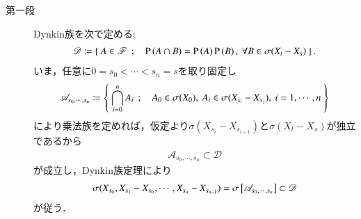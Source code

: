 \begin{prf}[Problem 1.4]\mbox{}
	\begin{description}
		\item[第一段]
			Dynkin族を次で定める:
			\begin{align}
				\mathscr{D} \coloneqq
				\left\{\ A \in \mathscr{F}\ \, ; \quad \operatorname{P} \left(A \cap B\right) = \operatorname{P} \left(A\right)\operatorname{P} \left(B\right),\ \forall B \in \sigma(X_t - X_s)\ \right\}.
			\end{align}
			いま，任意に$0 = s_0 < \cdots < s_n = s$を取り固定し
			\begin{align}
				\mathscr{A}_{s_0, \cdots, s_n} \coloneqq
				\left\{\ \bigcap_{i=0}^n A_i\ \, ; \quad A_0 \in \sigma(X_0),\ A_i \in \sigma(X_{s_i} - X_{s_j}),\ i=1,\cdots,n\ \right\}
			\end{align}
			により乗法族を定めれば，仮定より$\sigma(X_{s_i} - X_{s_{i-1}})$と$\sigma(X_t - X_s)$が独立であるから
			\begin{align}
				\mathscr{A}_{s_0, \cdots, s_n}
				\subset \mathscr{D}
			\end{align}
			が成立し，Dynkin族定理により
			\begin{align}
				\sigma(X_{s_0},X_{s_1}-X_{s_0},\cdots,X_{s_n} - X_{s_{n-1}})
				= \sigma \left[\mathscr{A}_{s_0, \cdots, s_n}\right]
				\subset \mathscr{D}
				\label{eq:thm_application_dynkin_system_theorem_to_independence_2}
			\end{align}
			が従う．
		

\end{description}
\end{prf}
